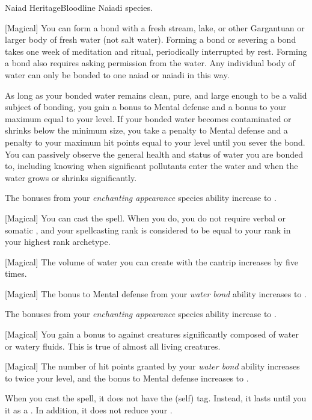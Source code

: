     \begin{feat}{Naiad Heritage}{Bloodline}
        \featpre Naiadi species.

        [Magical] You can form a bond with a fresh stream, lake, or other Gargantuan or larger body of fresh water (not salt water).
        Forming a bond or severing a bond takes one week of meditation and ritual, periodically interrupted by rest.
        Forming a bond also requires asking permission from the water.
        Any individual body of water can only be bonded to one naiad or naiadi in this way.

        As long as your bonded water remains clean, pure, and large enough to be a valid subject of bonding, you gain a  bonus to Mental defense and a bonus to your maximum  equal to your level.
        If your bonded water becomes contaminated or shrinks below the minimum size, you take a  penalty to Mental defense and a penalty to your maximum hit points equal to your level until you sever the bond.
        You can passively observe the general health and status of water you are bonded to, including knowing when significant pollutants enter the water and when the water grows or shrinks significantly.

         The bonuses from your \textit{enchanting appearance} species ability increase to .

        [Magical] You can cast the  spell.
        When you do, you do not require verbal or somatic , and your spellcasting rank is considered to be equal to your rank in your highest rank archetype.

        [Magical] The volume of water you can create with the  cantrip increases by five times.

        [Magical] The bonus to Mental defense from your \textit{water bond} ability increases to .

         The bonuses from your \textit{enchanting appearance} species ability increase to .

        [Magical] You gain a  bonus to  against creatures significantly composed of water or watery fluids.
        This is true of almost all living creatures.

        [Magical] The number of hit points granted by your \textit{water bond} ability increases to twice your level, and the bonus to Mental defense increases to .

         When you cast the  spell, it does not have the  (self) tag.
        Instead, it lasts until you  it as a .
        In addition, it does not reduce your .
    \end{feat}

